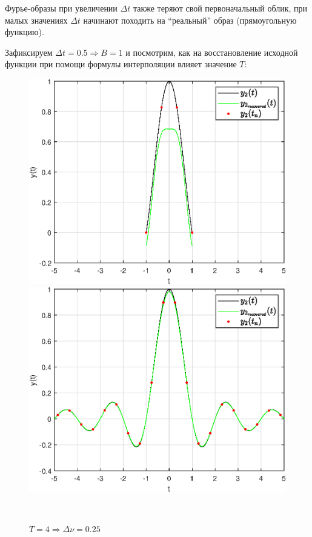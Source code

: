 \documentclass[a4paper]{article}
\begin{document}
Фурье-образы при увеличении $\Delta t$ также теряют свой первоначальный облик, при малых значениях $\Delta t$ начинают походить на ``реальный'' образ (прямоугольную функцию).

Зафиксируем $\Delta t = 0.5 \Rightarrow B = 1$ и посмотрим, как на восстановление исходной функции при помощи формулы интерполяции влияет значение $T$:

\begin{figure}[H]
    \begin{minipage}{0.5\textwidth}
        \centering \includegraphics[width=\textwidth]{graphs2/T_2_dt_0.5_B_1_dv_0.5/func2_recovered.eps}
        \caption{$T = 2 \Rightarrow \Delta \nu = 0.5$}
    \end{minipage}\hfill
    \begin{minipage}{0.5\textwidth}
        \centering \includegraphics[width=\textwidth]{graphs2/T_25_dt_0.5_B_1_dv_0.04/func2_recovered.eps}
        \caption{$T = 4 \Rightarrow \Delta \nu = 0.25$}
    \end{minipage}\\[1em]
\end{figure}\noindent\
\end{document}
